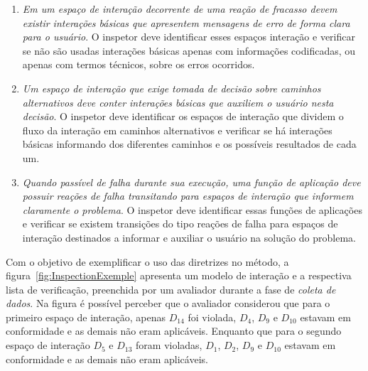 \begin{enumerate}


  \item {\em  Em um  espaço de interação  decorrente de uma  reação de
    fracasso devem existir interações básicas que apresentem mensagens
    de  erro  de  forma  clara  para  o  usuário}.   O  inspetor  deve
    identificar esses espaços interação  e verificar se não são usadas
    interações básicas  apenas com informações  codificadas, ou apenas
    com termos técnicos, sobre os erros ocorridos.
    
  \item {\em Um espaço de  interação que exige tomada de decisão sobre
    caminhos alternativos deve  conter interações básicas que auxiliem
    o usuário  nesta decisão}. O inspetor deve  identificar os espaços
    de  interação  que  dividem  o  fluxo  da  interação  em  caminhos
    alternativos e  verificar se há interações  básicas informando dos
    diferentes caminhos e os possíveis resultados de cada um.

  \item {\em Quando passível de falha durante sua execução, uma função
    de  aplicação  deve  possuir  reações de  falha  transitando  para
    espaços  de  interação que  informem  claramente  o problema}.   O
    inspetor deve identificar essas  funções de aplicações e verificar
    se existem  transições do  tipo reações de  falha para  espaços de
    interação destinados a informar e auxiliar o usuário na solução do
    problema.

\end{enumerate}

Com  o objetivo  de exemplificar  o uso  das diretrizes  no  método, a
figura~\ref{fig:InspectionExemple} apresenta um  modelo de interação e
a respectiva lista de verificação, preenchida por um avaliador durante
a fase de  {\em coleta de dados}. Na figura é  possível perceber que o
avaliador considerou  que para o primeiro espaço  de interação, apenas
$D_{14}$ foi violada, $D_4$,  $D_9$ e $D_{10}$ estavam em conformidade
e as demais não eram aplicáveis. Enquanto que para o segundo espaço de
interação  $D_5$ e  $D_{13}$  foram violadas,  $D_1$,  $D_2$, $D_9$  e
$D_{10}$ estavam em conformidade e as demais não eram aplicáveis.

